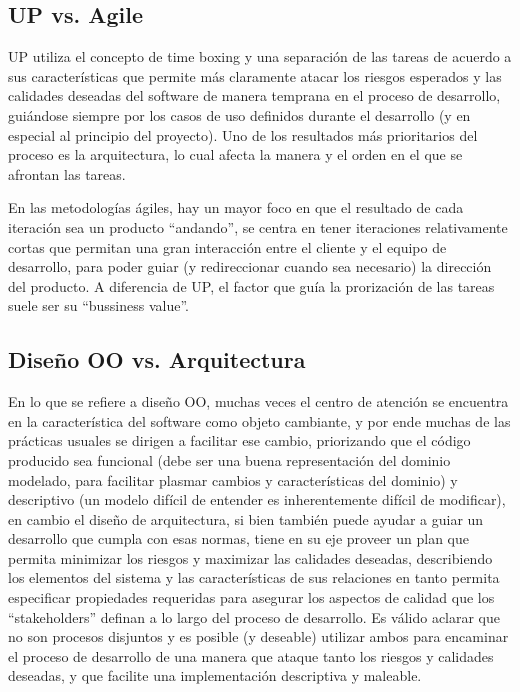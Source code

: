 \subsection{UP vs. Agile}

UP utiliza el concepto de time boxing y una separaci\'on de las tareas de 
acuerdo a sus caracter\'isticas que permite m\'as claramente atacar los riesgos 
esperados y las calidades deseadas del software de manera temprana en el 
proceso de desarrollo, gui\'andose siempre por los casos de uso definidos 
durante el desarrollo (y en especial al principio del proyecto). 
Uno de los resultados m\'as prioritarios del proceso es la arquitectura, lo 
cual afecta la manera y el orden en el que se afrontan las tareas.

En las metodolog\'ias \'agiles, hay un mayor foco en que el resultado de cada 
iteraci\'on sea un producto ``andando'',
se centra en tener iteraciones 
relativamente cortas que permitan una gran interacci\'on entre el cliente y el 
equipo de desarrollo, para poder guiar (y redireccionar cuando sea necesario) 
la direcci\'on del producto. A diferencia de UP, el factor que gu\'ia la 
prorizaci\'on de las tareas suele ser su ``bussiness value''.


\subsection{Dise\~{n}o OO vs. Arquitectura}

En lo que se refiere a dise\~{n}o OO, muchas veces el centro de atenci\'on se 
encuentra en la caracter\'istica del software como objeto cambiante, y por ende 
muchas de las pr\'acticas usuales se dirigen a facilitar ese cambio, priorizando 
que el c\'odigo producido sea funcional (debe ser una buena representaci\'on del 
dominio modelado, para facilitar plasmar cambios y caracter\'isticas del dominio) 
y descriptivo (un modelo dif\'icil de entender es inherentemente dif\'icil de 
modificar), en cambio el dise\~{n}o de arquitectura, si bien tambi\'en puede ayudar a 
guiar un desarrollo que cumpla con esas normas, tiene en su eje proveer un plan 
que permita minimizar los riesgos y maximizar las calidades deseadas, 
describiendo los elementos del sistema y las caracter\'isticas de sus relaciones 
en tanto permita especificar propiedades requeridas para asegurar los aspectos 
de calidad que los ``stakeholders''
definan a lo largo del proceso de desarrollo. 
Es v\'alido aclarar que no son procesos disjuntos y es posible (y deseable) 
utilizar ambos para encaminar el proceso de desarrollo de una manera que ataque 
tanto los riesgos y calidades deseadas, y que facilite una implementaci\'on 
descriptiva y maleable.

